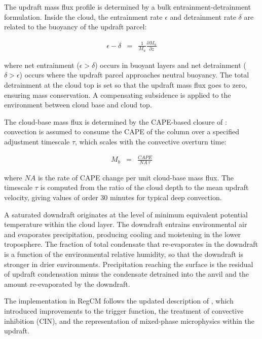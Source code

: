 {\begin{enumerate}
The updraft mass flux profile is determined by a bulk entrainment-detrainment
formulation. Inside the cloud, the entrainment rate $\epsilon$ and detrainment
rate $\delta$ are related to the buoyancy of the updraft parcel:

\begin{eqnarray}
\epsilon - \delta &=& \frac{1}{M_u}\frac{\partial M_u}{\partial z}
\label{eqn_model:KFentrdet}
\end{eqnarray}

where net entrainment ($\epsilon > \delta$) occurs in buoyant layers and net
detrainment ($\delta > \epsilon$) occurs where the updraft parcel approaches
neutral buoyancy. The total detrainment at the cloud top is set so that the
updraft mass flux goes to zero, ensuring mass conservation. A compensating
subsidence is applied to the environment between cloud base and cloud top.

The cloud-base mass flux is determined by the CAPE-based closure of
\citet{Fritsch_80}: convection is assumed to consume the CAPE of the column
over a specified adjustment timescale $\tau$, which scales with the convective
overturn time:

\begin{eqnarray}
M_b &=& \frac{CAPE}{NA\,\tau}
\label{eqn_model:KFclosure}
\end{eqnarray}

where $NA$ is the rate of CAPE change per unit cloud-base mass flux. The
timescale $\tau$ is computed from the ratio of the cloud depth to the mean
updraft velocity, giving values of order 30 minutes for typical deep
convection.

A saturated downdraft originates at the level of minimum equivalent potential
temperature within the cloud layer. The downdraft entrains environmental air and
evaporates precipitation, producing cooling and moistening in the lower
troposphere. The fraction of total condensate that re-evaporates in the
downdraft is a function of the environmental relative humidity, so that the
downdraft is stronger in drier environments. Precipitation reaching the
surface is the residual of updraft condensation minus the condensate detrained
into the anvil and the amount re-evaporated by the downdraft.

The implementation in RegCM follows the updated description of \citet{Kain_04},
which introduced improvements to the trigger function, the treatment of
convective inhibition (CIN), and the representation of mixed-phase
microphysics within the updraft.\\


\end{enumerate}}
